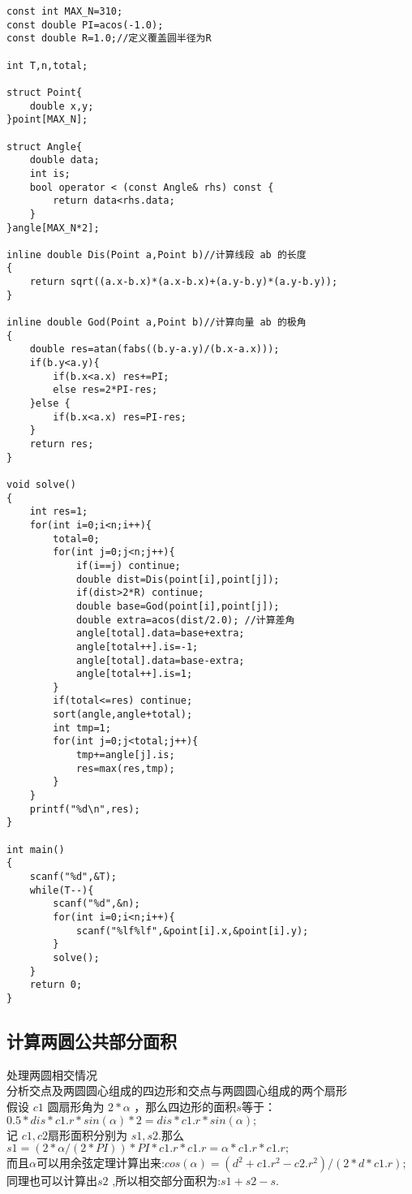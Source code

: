\begin{lstlisting}
const int MAX_N=310;
const double PI=acos(-1.0);
const double R=1.0;//定义覆盖圆半径为R

int T,n,total;

struct Point{
    double x,y;
}point[MAX_N];

struct Angle{
    double data;
    int is;
    bool operator < (const Angle& rhs) const {
        return data<rhs.data;
    }
}angle[MAX_N*2];

inline double Dis(Point a,Point b)//计算线段 ab 的长度
{
    return sqrt((a.x-b.x)*(a.x-b.x)+(a.y-b.y)*(a.y-b.y));
}

inline double God(Point a,Point b)//计算向量 ab 的极角
{
    double res=atan(fabs((b.y-a.y)/(b.x-a.x)));
    if(b.y<a.y){
        if(b.x<a.x) res+=PI;
        else res=2*PI-res;
    }else {
        if(b.x<a.x) res=PI-res;
    }
    return res;
}

void solve()
{
    int res=1;
    for(int i=0;i<n;i++){
        total=0;
        for(int j=0;j<n;j++){
            if(i==j) continue;
            double dist=Dis(point[i],point[j]);
            if(dist>2*R) continue;
            double base=God(point[i],point[j]);
            double extra=acos(dist/2.0); //计算差角
            angle[total].data=base+extra;
            angle[total++].is=-1;
            angle[total].data=base-extra;
            angle[total++].is=1;
        }
        if(total<=res) continue;
        sort(angle,angle+total);
        int tmp=1;
        for(int j=0;j<total;j++){
            tmp+=angle[j].is;
            res=max(res,tmp);
        }
    }
    printf("%d\n",res);
}

int main()
{
    scanf("%d",&T);
    while(T--){
        scanf("%d",&n);
        for(int i=0;i<n;i++){
            scanf("%lf%lf",&point[i].x,&point[i].y);
        }
        solve();
    }
    return 0;
}
\end{lstlisting}
\subsection{计算两圆公共部分面积}
处理两圆相交情况 \\
分析交点及两圆圆心组成的四边形和交点与两圆圆心组成的两个扇形\\
假设 $c1$ 圆扇形角为 $2*\alpha$ ，那么四边形的面积$s$等于：$0.5*dis*c1.r*sin(\alpha)*2=dis*c1.r*sin(\alpha);$ \\
记 $c1,c2 $扇形面积分别为 $s1,s2 $.那么$s1=(2*\alpha/(2*PI))*PI*c1.r*c1.r=\alpha*c1.r*c1.r;$ \\
而且$\alpha$可以用余弦定理计算出来:$cos(\alpha)=(d^2+c1.r^2-c2.r^2)/(2*d*c1.r);$ \\
同理也可以计算出$s2$ ,所以相交部分面积为:$s1+s2-s$.


